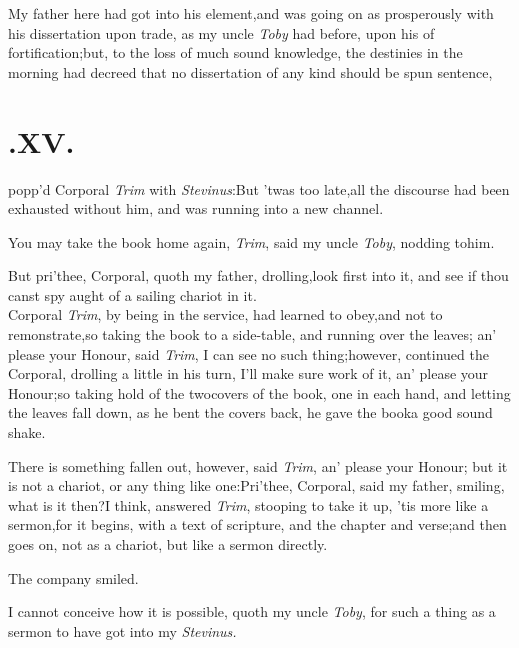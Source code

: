 \documentclass{article}
\begin{document}
My father here had got into his element,\tsh and was going on
as pros\-per\-ously with his dissertation upon trade, as my uncle
\textit{Toby} had before, upon his\break 
of fortification;\tsh but, to the loss\break
of much sound knowledge, the destinies in the morning had
decreed that no
dissertation of any kind should be spun
\break sentence,

\null
\section{.\enspace  XV.}

 popp’d Corporal \textit{Trim} with
\textit{Stevinus}:\tsk But ’twas too late,\tsk all the\break
discourse had been exhausted without him, and was running into a
new channel.

\tsk You may take the book home again, \textit{Trim}, said my
uncle \textit{Toby}, nodding to\break him.

But pri’thee, Corporal, quoth my father, drolling,\tsk look
first into it, and see if thou canst spy aught of a
sailing\break
chariot in it.\\
\newpage
Corporal \textit{Trim}, by being in the service, had learned to
obey,\tsk and not to remonstrate,\tsk so taking the book to a
side-table, and running over the leaves; an’ please your
Honour, said \textit{Trim}, I can see no such thing;\tsk however,
continued the Corporal, drolling a little in his turn, I’ll
make sure work of it, an’ please your Honour;\tsk so taking
hold of the two\break covers of the book, one in each hand, and letting
the leaves fall down, as he bent the covers back, he gave the
book\break a good sound shake.

There is something fallen out, however, said \textit{Trim},
an’ please your Honour; but it is not a chariot, or any
thing like one:\tsk Pri’thee, Corporal, said my father, smiling,
what is it then?\tsk I think, answered \textit{Trim}, stooping to
take it up,\tsk\break  
’tis more like a sermon,\tsk for it begins,
with a text of scripture, and
the chapter and verse;\tsk and then goes on, not as a chariot,
but like a sermon directly.

The company smiled.

I cannot conceive how it is possible, quoth my uncle
\textit{Toby}, for such a thing as a sermon to have got into my
\textit{Stevinus.}
\end{document}
